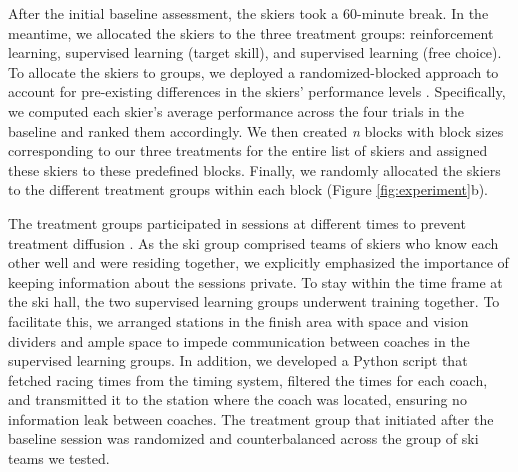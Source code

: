 \documentclass[pdflatex,sn-mathphys-num]{sn-jnl}%
\theoremstyle{thmstyleone}%
\theoremstyle{thmstyletwo}%
\theoremstyle{thmstylethree}%
\begin{document}
After the initial baseline assessment, the skiers took a 60-minute break. In the meantime, we allocated the skiers to the three treatment groups: reinforcement learning, supervised learning (target skill), and supervised learning (free choice). To allocate the skiers to groups, we deployed a randomized-blocked approach to account for pre-existing differences in the skiers’ performance levels \cite{maxwell_designing_2017}. Specifically, we computed each skier’s average performance across the four trials in the baseline and ranked them accordingly. We then created \textit{n} blocks with block sizes corresponding to our three treatments for the entire list of skiers and assigned these skiers to these predefined blocks. Finally, we randomly allocated the skiers to the different treatment groups within each block (Figure \ref{fig:experiment}b).

The treatment groups participated in sessions at different times to prevent treatment diffusion \cite{maxwell_designing_2017}. As the ski group comprised teams of skiers who know each other well and were residing together, we explicitly emphasized the importance of keeping information about the sessions private. To stay within the time frame at the ski hall, the two supervised learning groups underwent training together. To facilitate this, we arranged stations in the finish area with space and vision dividers and ample space to impede communication between coaches in the supervised learning groups. In addition, we developed a Python script that fetched racing times from the timing system, filtered the times for each coach, and transmitted it to the station where the coach was located, ensuring no information leak between coaches. The treatment group that initiated after the baseline session was randomized and counterbalanced across the group of ski teams we tested.
\end{document}
